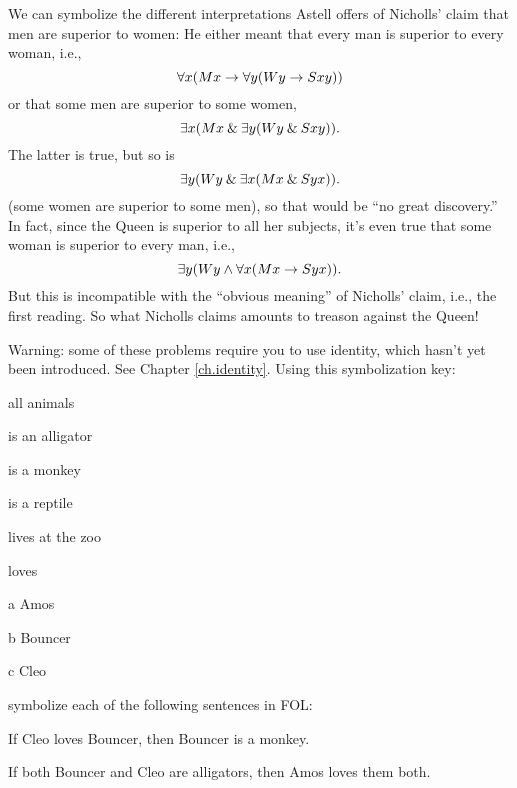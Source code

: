 We can symbolize the different interpretations Astell offers of
Nicholls' claim that men are superior to women:
He either meant that every man is superior to every woman, i.e.,
\[
\forall x(Mx \rightarrow \forall y(Wy \rightarrow Sxy))
\]
or that some men are superior to some women,
\[
\exists x(Mx \mathbin{\&} \exists y(Wy \mathbin{\&} Sxy)).
\]
The latter is true, but so is
\[
\exists y(Wy \mathbin{\&} \exists x(Mx \mathbin{\&} Syx)).
\]
(some women are superior to some men), so that would be ``no great
discovery.''  In fact, since the Queen is superior to all her
subjects, it's even true that some woman is superior to every man,
i.e.,
\[
\exists y(Wy \land \forall x(Mx \rightarrow Syx)).
\]
But this is incompatible with the ``obvious meaning'' of Nicholls'
claim, i.e., the first reading. So what Nicholls claims amounts to
treason against the Queen!

\begin{practiceproblems}
\solutions
Warning: some of these problems require you to use identity, which hasn't yet been introduced. See Chapter \ref{ch.identity}.
\problempart
Using this symbolization key:
\begin{ekey}
\item[\text{domain}] all animals
\item[\atom{A}{x}]  is an alligator
\item[\atom{M}{x}]  is a monkey
\item[\atom{R}{x}]  is a reptile
\item[\atom{Z}{x}]  lives at the zoo
\item[\atom{L}{x,y}]  loves 
\item[a] Amos
\item[b] Bouncer
\item[c] Cleo
\end{ekey}
symbolize each of the following sentences in FOL:
\begin{earg}
\item If Cleo loves Bouncer, then Bouncer is a monkey.
\item[] 
\item If both Bouncer and Cleo are alligators, then Amos loves them both.
\item[] 

\end{earg}
\end{practiceproblems}
